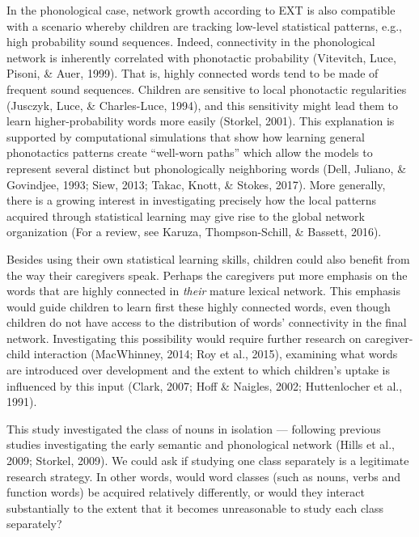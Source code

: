 \documentclass[english,,man,floatsintext]{apa6}
\begin{document}
In the phonological case, network growth according to EXT is also compatible with a scenario whereby children are tracking low-level statistical patterns, e.g., high probability sound sequences. Indeed, connectivity in the phonological network is inherently correlated with phonotactic probability (Vitevitch, Luce, Pisoni, \& Auer, 1999). That is, highly connected words tend to be made of frequent sound sequences. Children are sensitive to local phonotactic regularities (Jusczyk, Luce, \& Charles-Luce, 1994), and this sensitivity might lead them to learn higher-probability words more easily (Storkel, 2001). This explanation is supported by computational simulations that show how learning general phonotactics patterns create \enquote{well-worn paths} which allow the models to represent several distinct but phonologically neighboring words (Dell, Juliano, \& Govindjee, 1993; Siew, 2013; Takac, Knott, \& Stokes, 2017). More generally, there is a growing interest in investigating precisely how the local patterns acquired through statistical learning may give rise to the global network organization (For a review, see Karuza, Thompson-Schill, \& Bassett, 2016).

Besides using their own statistical learning skills, children could also benefit from the way their caregivers speak. Perhaps the caregivers put more emphasis on the words that are highly connected in \emph{their} mature lexical network. This emphasis would guide children to learn first these highly connected words, even though children do not have access to the distribution of words' connectivity in the final network. Investigating this possibility would require further research on caregiver-child interaction (MacWhinney, 2014; Roy et al., 2015), examining what words are introduced over development and the extent to which children's uptake is influenced by this input (Clark, 2007; Hoff \& Naigles, 2002; Huttenlocher et al., 1991).

This study investigated the class of nouns in isolation --- following previous studies investigating the early semantic and phonological network (Hills et al., 2009; Storkel, 2009). We could ask if studying one class separately is a legitimate research strategy. In other words, would word classes (such as nouns, verbs and function words) be acquired relatively differently, or would they interact substantially to the extent that it becomes unreasonable to study each class separately?
\end{document}
